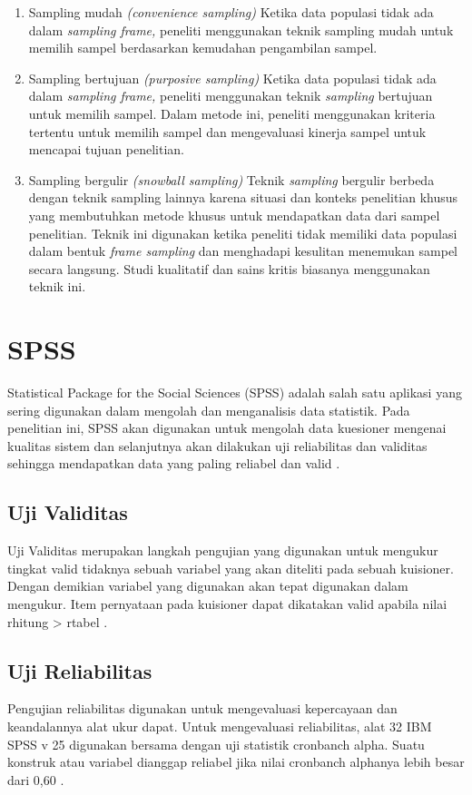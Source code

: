 \begin{enumerate}
	\item Sampling mudah \textit{(convenience sampling)} Ketika data populasi tidak ada dalam \textit{sampling frame,} peneliti menggunakan teknik sampling mudah untuk memilih sampel berdasarkan kemudahan pengambilan sampel. 
	\item Sampling bertujuan \textit{(purposive sampling)} Ketika data populasi tidak ada dalam \textit{sampling frame,} peneliti menggunakan teknik \textit{sampling} bertujuan untuk memilih sampel. Dalam metode ini, peneliti menggunakan kriteria tertentu untuk memilih sampel dan mengevaluasi kinerja sampel untuk mencapai tujuan penelitian. 
	\item Sampling bergulir \textit{(snowball sampling)} Teknik \textit{sampling} bergulir berbeda dengan teknik \textit{}sampling lainnya karena situasi dan konteks penelitian khusus yang membutuhkan metode khusus untuk mendapatkan data dari sampel penelitian. Teknik ini digunakan ketika peneliti tidak memiliki data populasi dalam bentuk \textit{frame sampling} dan menghadapi kesulitan menemukan sampel secara langsung. Studi kualitatif dan sains kritis biasanya menggunakan teknik ini.

\end{enumerate}

\section{SPSS}
Statistical Package for the Social Sciences (SPSS) adalah salah satu aplikasi yang sering digunakan dalam mengolah dan menganalisis data statistik. Pada penelitian ini, SPSS akan digunakan untuk mengolah data kuesioner mengenai kualitas sistem dan selanjutnya akan dilakukan uji reliabilitas dan
validitas sehingga mendapatkan data yang paling reliabel dan valid \cite{sarwono2017mengenal}.

\subsection{Uji Validitas}
Uji Validitas merupakan langkah pengujian yang digunakan untuk mengukur tingkat valid tidaknya sebuah variabel yang akan diteliti pada sebuah kuisioner. Dengan demikian variabel yang digunakan akan tepat digunakan dalam mengukur. Item pernyataan pada kuisioner dapat dikatakan valid apabila nilai rhitung > rtabel \cite{anggraini2022pembelajaran}.

\subsection{Uji Reliabilitas}
Pengujian reliabilitas digunakan untuk mengevaluasi kepercayaan dan keandalannya alat ukur dapat. Untuk mengevaluasi reliabilitas, alat 32 IBM SPSS v 25 digunakan bersama dengan uji statistik cronbanch alpha. Suatu konstruk atau variabel dianggap reliabel jika nilai cronbanch alphanya lebih besar dari 0,60 \cite{janti2014analisis}.

